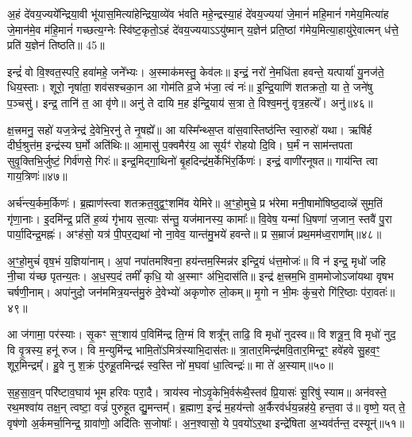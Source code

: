अ॒हं दे॑वय॒ज्यये᳚न्द्रिया॒वी भू॑यास॒मित्या॑हेन्द्रिया॒व्ये॑व भ॑वति महे॒न्द्रस्या॒हं दे॑वय॒ज्यया॑ जे॒मानं॑ महि॒मानं॑ गमेय॒मित्या॑ह जे॒मान॑मे॒व म॑हि॒मानं॑ गच्छत्य॒ग्नेः स्वि॑ष्ट॒कृतो॒\-ऽहं दे॑वय॒ज्यया\-ऽ\-ऽयु॑ष्मान् य॒ज्ञेन॑ प्रति॒ष्ठां ग॑मेय॒मित्या॒हायु॑रे॒वात्मन् ध॑त्ते॒ प्रति॑ य॒ज्ञेन॑ तिष्ठति॥ 45॥

{\anuvakamend[{प्र॒ति॒ष्ठाम॑ह्व॒दस्तु॑ वि॒द्युतं॑ वस॒न्तमे॒वेन्द्र॑स्या॒\-ऽष्टात्रिꣳ॑शच्च॥11॥}]}

इन्द्रं॑ वो वि॒श्वत॒स्परि॒ हवा॑महे॒ जने᳚भ्यः। अ॒स्माक॑मस्तु॒ केव॑लः॥ इन्द्रं॒ नरो॑ ने॒मधि॑ता हवन्ते॒ यत्पार्या॑ यु॒नज॑ते॒ धिय॒स्ताः। शूरो॒ नृषा॑ता॒ शव॑सश्चका॒न आ गोम॑ति व्र॒जे भ॑जा॒ त्वं नः॑॥ इ॒न्द्रि॒याणि॑ शतक्रतो॒ या ते॒ जने॑षु प॒ञ्चसु॑। इन्द्र॒ तानि॑ त॒ आ वृ॑णे॥ अनु॑ ते दायि म॒ह इ॑न्द्रि॒याय॑ स॒त्रा ते॒ विश्व॒मनु॑ वृत्र॒हत्ये᳚। अनु॑॥४६॥

क्ष॒त्त्रमनु॒ सहो॑ यज॒त्रेन्द्र॑ दे॒वेभि॒रनु॑ ते नृ॒षह्ये᳚॥ आ यस्मि᳚न्थ्स॒प्त वा॑स॒वास्तिष्ठ॑न्ति स्वा॒रुहो॑ यथा। ऋषि॑र्\mbox{}ह दीर्घ॒श्रुत्त॑म॒ इन्द्र॑स्य घ॒र्मो अति॑थिः॥ आ॒मासु॑ प॒क्वमैर॑य॒ आ सूर्यꣳ॑ रोहयो दि॒वि। घ॒र्मं न साम॑न्तपता सुवृ॒क्तिभि॒र्जुष्टं॒ गिर्व॑णसे॒ गिरः॑॥ इन्द्र॒मिद्गा॒थिनो॑ बृ॒हदिन्द्र॑म॒र्केभि॑र॒र्किणः॑। इन्द्रं॒ वाणी॑रनूषत॥ गाय॑न्ति त्वा गाय॒त्रिणः॑॥४७॥

अर्च॑न्त्य॒र्कम॒र्किणः॑। ब्र॒ह्माण॑स्त्वा शतक्रत॒वुद्व॒ꣳ॒शमि॑व येमिरे॥ अ॒ꣳ॒हो॒मुचे॒ प्र भ॑रेमा मनी॒षामो॑षिष्ठ॒दाव्न्ने॑ सुम॒तिं गृ॑णा॒नाः। इ॒दमि॑न्द्र॒ प्रति॑ ह॒व्यं गृ॑भाय स॒त्याः स॑न्तु॒ यज॑मानस्य॒ कामाः᳚॥ वि॒वेष॒ यन्मा॑ धि॒षणा॑ ज॒जान॒ स्तवै॑ पु॒रा पार्या॒दिन्द्र॒मह्नः॑। अꣳह॑सो॒ यत्र॑ पी॒पर॒द्यथा॑ नो ना॒वेव॒ यान्त॑मु॒भये॑ हवन्ते॥ प्र स॒म्राजं॑ प्रथ॒मम॑ध्व॒राणा᳚म्॥४८॥

अ॒ꣳ॒हो॒मुचं॑ वृष॒भं य॒ज्ञिया॑नाम्। अ॒पां नपा॑तमश्विना॒ हय॑न्तम॒स्मिन्न॑र इन्द्रि॒यं ध॑त्त॒मोजः॑॥ वि न॑ इन्द्र॒ मृधो॑ जहि नी॒चा य॑च्छ पृतन्य॒तः। अ॒ध॒स्प॒दं तमीं᳚ कृधि॒ यो अ॒स्माꣳ अ॑भि॒दास॑ति॥ इन्द्र॑ क्ष॒त्त्रम॒भि वा॒ममोजो\-ऽजा॑यथा वृषभ चर्\mbox{}षणी॒नाम्। अपा॑नुदो॒ जन॑ममित्र॒यन्त॑मु॒रुं दे॒वेभ्यो॑ अकृणोरु लो॒कम्॥ मृ॒गो न भी॒मः कु॑च॒रो गि॑रि॒ष्ठाः प॑रा॒वतः॑॥४९॥

आ ज॑गामा॒ पर॑स्याः। सृ॒कꣳ स॒ꣳ॒शाय॑ प॒विमि॑न्द्र ति॒ग्मं वि शत्रू᳚न् ताढि॒ वि मृधो॑ नुदस्व॥ वि शत्रू॒न्॒ वि मृधो॑ नुद॒ वि वृ॒त्रस्य॒ हनू॑ रुज। वि म॒न्युमि॑न्द्र भामि॒तो॑\-ऽमित्र॑स्याभि॒दास॑तः॥ त्रा॒तार॒मिन्द्र॑मवि॒तार॒मिन्द्र॒ꣳ॒ हवे॑हवे सु॒हव॒ꣳ॒ शूर॒मिन्द्रम्᳚। हु॒वे नु श॒क्रं पु॑रुहू॒तमिन्द्रꣴ॑ स्व॒स्ति नो॑ म॒घवा॑ धा॒त्विन्द्रः॑॥ मा ते॑ अ॒स्याम्॥५०॥

स॒ह॒सा॒व॒न् परि॑ष्टाव॒घाय॑ भूम हरिवः परा॒दै। त्राय॑स्व नो\-ऽवृ॒केभि॒र्वरू॑थै॒स्तव॑ प्रि॒यासः॑ सू॒रिषु॑ स्याम॥ अन॑वस्ते॒ रथ॒मश्वा॑य तक्ष॒न् त्वष्टा॒ वज्रं॑ पुरुहूत द्यु॒मन्तम्᳚। ब्र॒ह्माण॒ इन्द्रं॑ म॒हय॑न्तो अ॒र्कैरव॑र्धय॒न्नह॑ये॒ हन्त॒वा उ॑॥ वृष्णे॒ यत् ते॒ वृष॑णो अ॒र्कमर्चा॒निन्द्र॒ ग्रावा॑णो॒ अदि॑तिः स॒जोषाः᳚। अ॒न॒श्वासो॒ ये प॒वयो॑\-ऽर॒था इन्द्रे॑षिता अ॒भ्यव॑र्तन्त॒ दस्यून्॑॥५१॥

